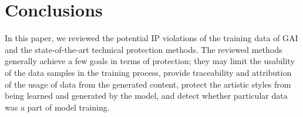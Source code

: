 \documentclass[conference]{IEEEtran}
\begin{document}
\section{Conclusions}\label{sec:conclusion}
In this paper, we reviewed the potential IP violations of the training data of GAI and the state-of-the-art technical protection methods.
The reviewed methods generally achieve a few goals in terms of protection; they may limit the usability of the data samples in the training process, provide traceability and attribution of the usage of data from the generated content, protect the artistic styles from being learned and generated by the model, and detect whether particular data was a part of model training.   



  
\end{document}
